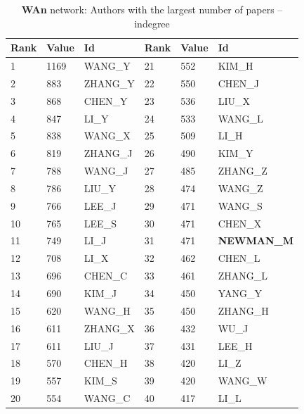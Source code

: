 \documentclass[11pt]{article} %
\begin{document}
\begin{table}
\caption{\textbf{WAn} network: \label{numpap} Authors with the largest number of papers -- indegree}
\renewcommand{\arraystretch}{0.9}
\begin{center}
\begin{tabular}{l|l|l||l|l|l}
Rank& 	Value& 	Id& 	Rank& 	Value& 	Id\\  \hline   
1& 	1169& 	WANG\_Y& 	21& 	552& 	KIM\_H\\ 
2& 	883& 	ZHANG\_Y& 	22& 	550& 	CHEN\_J\\ 
3& 	868& 	CHEN\_Y& 	23& 	536& 	LIU\_X\\ 
4& 	847& 	LI\_Y& 	24& 	533& 	WANG\_L\\ 
5& 	838& 	WANG\_X& 	25& 	509& 	LI\_H\\ 
6& 	819& 	ZHANG\_J& 	26& 	490& 	KIM\_Y\\ 
7& 	788& 	WANG\_J& 	27& 	485& 	ZHANG\_Z\\ 
8& 	786& 	LIU\_Y& 	28& 	474& 	WANG\_Z\\ 
9& 	766& 	LEE\_J& 	29& 	471& 	WANG\_S\\ 
10& 	765& 	LEE\_S& 	30& 	471& 	CHEN\_X\\ 
11& 	749& 	LI\_J& 	31& 	471& 	\textbf{NEWMAN\_M}\\ 
12& 	708& 	LI\_X& 	32& 	462& 	CHEN\_L\\ 
13& 	696& 	CHEN\_C& 	33& 	461& 	ZHANG\_L\\ 
14& 	690& 	KIM\_J& 	34& 	450& 	YANG\_Y\\ 
15& 	620& 	WANG\_H& 	35& 	450& 	ZHANG\_H\\ 
16& 	611& 	ZHANG\_X& 	36& 	432& 	WU\_J\\ 
17& 	611& 	LIU\_J& 	37& 	431& 	LEE\_H\\ 
18& 	570& 	CHEN\_H& 	38& 	420& 	LI\_Z\\ 
19& 	557& 	KIM\_S& 	39& 	420& 	WANG\_W\\ 
20& 	554& 	WANG\_C& 	40& 	417& 	LI\_L\\ \hline  
\end{tabular}
\end{center}
\end{table}
\end{document}
